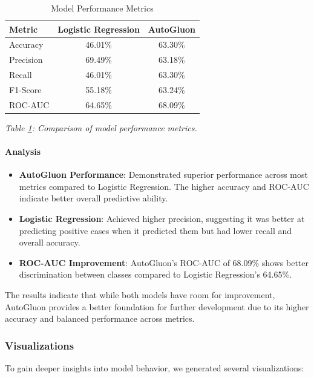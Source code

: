 \documentclass{article}
\begin{document}
\begin{table}[H]
\centering
\caption{Model Performance Metrics}
\label{tab:model_performance}
\begin{tabular}{lcc}
\toprule
\textbf{Metric} & \textbf{Logistic Regression} & \textbf{AutoGluon} \\
\midrule
Accuracy & 46.01\% & 63.30\% \\
Precision & 69.49\% & 63.18\% \\
Recall & 46.01\% & 63.30\% \\
F1-Score & 55.18\% & 63.24\% \\
ROC-AUC & 64.65\% & 68.09\% \\
\bottomrule
\end{tabular}
\end{table}

\textit{Table \ref{tab:model_performance}: Comparison of model performance metrics.}

\paragraph{Analysis}

\begin{itemize}[leftmargin=*]
    \item \textbf{AutoGluon Performance}: Demonstrated superior performance across most metrics compared to Logistic Regression. The higher accuracy and ROC-AUC indicate better overall predictive ability.
    \item \textbf{Logistic Regression}: Achieved higher precision, suggesting it was better at predicting positive cases when it predicted them but had lower recall and overall accuracy.
    \item \textbf{ROC-AUC Improvement}: AutoGluon's ROC-AUC of 68.09\% shows better discrimination between classes compared to Logistic Regression's 64.65\%.
\end{itemize}

The results indicate that while both models have room for improvement, AutoGluon provides a better foundation for further development due to its higher accuracy and balanced performance across metrics.

\subsubsection{Visualizations}

To gain deeper insights into model behavior, we generated several visualizations:
\end{document}

